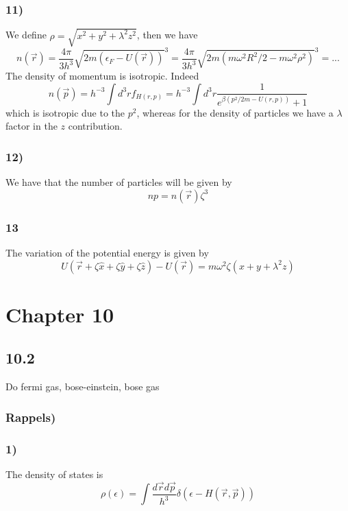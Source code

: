 \documentclass[10pt,a4paper]{book}
\begin{document}

\subsection*{11)}
We define $\rho=\sqrt{x^2+y^2+\lambda^2 z^2}$, then we have
$$n(\vec{r})=\frac{4\pi}{3h^3}\sqrt{2m(\epsilon_F-U(\vec{r}))}^3=\frac{4\pi}{3h^3}\sqrt{2m(m\omega^2 R^2/2-m\omega^2\rho^2)}^3=...$$
The density of momentum is isotropic. Indeed
$$n(\vec{p})=h^{-3}\int d^3rf_{H(r,p)}=h^{-3}\int d^3r\frac{1}{e^{\beta(p^2/2m-U(r,p))}+1}$$ which is isotropic due to the $p^2$, whereas for the density of particles we have a $\lambda$ factor in the $z$ contribution.

\subsection*{12)}
We have that the number of particles will be given by 
$$np=n(\vec{r})\zeta^3$$

\subsection*{13}
The variation of the potential energy is given by 
$$U(\vec{r}+\zeta\hat{x}+\zeta\hat{y}+\zeta\hat{z})-U(\vec{r})=m\omega^2\zeta(x+y+\lambda^2z)$$




\chapter*{Chapter 10}
\section*{10.2}
Do fermi gas, bose-einstein, bose gas

\subsection*{Rappels)}



\subsection*{1)}
The density of states is 
$$\rho(\epsilon)=\int\frac{d\vec{r}d\vec{p}}{h^3}\delta(\epsilon-H(\vec{r},\vec{p}))$$
\end{document}
